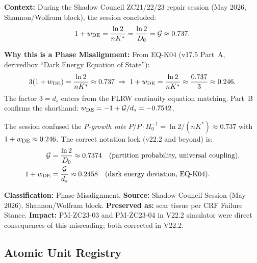 \documentclass[12pt, a4paper]{article}
\begin{document}
\begin{formalbox}[title={PM-ZC23-05 (NEW v2): Shadow Council EQ-K04 Misreading}]
\label{zc22:pm:zc23-05}
\textbf{Context:} During the Shadow Council ZC21/22/23 repair session
(May 2026, Shannon/Wolfram block), the session concluded:
\[
  1 + w_{\rm DE} = \frac{\ln 2}{nK^*} = \frac{\ln 2}{D_0} = \mathcal{G} \approx 0.737.
\]

\textbf{Why this is a Phase Misalignment:}
From EQ-K04 (v17.5 Part~A, derivedbox ``Dark Energy Equation of State''):
\[
  3(1 + w_{\rm DE}) = \frac{\ln 2}{nK^*} \approx 0.737
  \;\Rightarrow\;
  1 + w_{\rm DE} = \frac{\ln 2}{nK^*} \approx \frac{0.737}{3} \approx 0.246.
\]
The factor $3 = d_s$ enters from the FLRW continuity equation matching.
Part~B confirms the shorthand: $w_{\rm DE} = -1 + \mathcal{G}/d_s = -0.7542$.

The session confused the \emph{P-growth rate} $\dot{P}/P\cdot H_0^{-1} = \ln2/(nK^*) \approx 0.737$
with $1 + w_{\rm DE} \approx 0.246$.
The correct notation lock (v22.2 and beyond) is:
\begin{align*}
  \mathcal{G} &= \frac{\ln 2}{D_0} \approx 0.7374
    \quad\text{(partition probability, universal coupling)},\\
  1 + w_{\rm DE} &= \frac{\mathcal{G}}{d_s} \approx 0.2458
    \quad\text{(dark energy deviation, EQ-K04)}.
\end{align*}

\textbf{Classification:} Phase Misalignment.
\textbf{Source:} Shadow Council Session (May 2026), Shannon/Wolfram block.
\textbf{Preserved as:} scar tissue per CRF Failure Stance.
\textbf{Impact:} PM-ZC23-03 and PM-ZC23-04 in V22.2 simulator were direct
consequences of this misreading; both corrected in V22.2.
\end{formalbox}

\subsection{Atomic Unit Registry}
\label{zc22:sec:registry}
\end{document}
